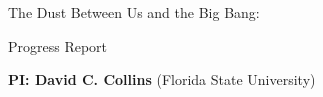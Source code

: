 \documentclass[11pt]{NSF}  %
\begin{document}
\begin{centering}
\begin{LARGE}

The Dust Between Us and the Big Bang:

Progress Report 

\end{LARGE}


{\bf PI: David C. Collins} (Florida State University)
\vspace{4mm}

\end{centering}
\pagestyle{plain}




%



\end{document}
